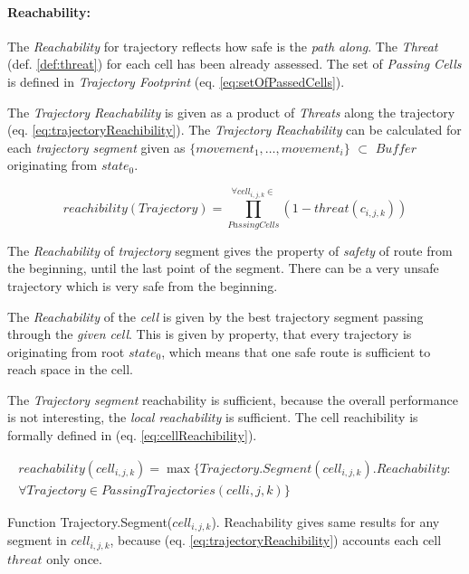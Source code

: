 \paragraph{Reachability:} The \emph{Reachability} for trajectory reflects how safe is the \emph{path along}. The \emph{Threat} (def. \ref{def:threat}) for each cell has been already assessed.  The set of \emph{Passing Cells} is defined in \emph{Trajectory Footprint} (eq. \ref{eq:setOfPassedCells}).

The \emph{Trajectory Reachability} is given as a product of \emph{Threats} along the trajectory (eq. \ref{eq:trajectoryReachibility}). The \emph{Trajectory Reachability} can be calculated for each \emph{trajectory segment} given as $\{movement_1,\dots,movement_i\}$ $\subset$ $Buffer$ originating from $state_0$.


\begin{equation}\label{eq:trajectoryReachibility}
    reachibility(Trajectory) = \prod_{Passing Cells}^{\forall cell_{i,j,k}\in} \left(1- threat(c_{i,j,k})\right)
\end{equation}

\begin{note}
    The \emph{Reachability} of \emph{trajectory} segment gives the property of \emph{safety} of route from the beginning, until the last point of the segment. There can be a very unsafe trajectory which is very safe from the beginning.
\end{note}


The \emph{Reachability} of the \emph{cell} is given by the best trajectory segment passing through the \emph{given cell}. This is given by property, that every trajectory is originating from root $state_0$, which means that one safe route is sufficient to reach space in the cell.

\newpage
The \emph{Trajectory segment} reachability is sufficient, because the overall performance is not interesting, the \emph{local reachability} is sufficient. The cell reachibility is formally defined in (eq. \ref{eq:cellReachibility}).

\begin{multline}\label{eq:cellReachibility}
    reachability(cell_{i,j,k}) = \max\{Trajectory.Segment(cell_{i,j,k}). Reachability: \\\forall Trajectory \in Passing Trajectories (cell{i,j,k})\}
\end{multline}
    
\begin{note}
    Function Trajectory.Segment($cell_{i,j,k}$). Reachability gives same results for any segment in $cell_{i,j,k}$, because (eq. \ref{eq:trajectoryReachibility}) accounts each cell $threat$ only once.
\end{note}

